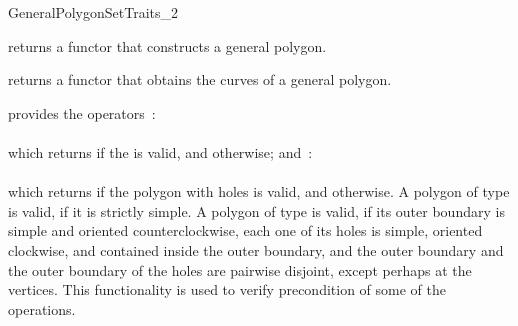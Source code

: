 \begin{ccRefConcept}{GeneralPolygonSetTraits_2}

{returns a functor that constructs a general polygon.}

{returns a functor that obtains the curves of a general polygon.}

{provides the operators~: \\
  \\
 which returns  if the  is valid, and 
 otherwise; and~: \\
  \\
 which returns  if the polygon with holes  
 is valid, and  otherwise.
 A polygon of type  is valid, if it is strictly simple.
 A polygon of type  is valid, if its outer 
 boundary is simple and oriented counterclockwise, each one of its holes 
 is simple, oriented clockwise, and contained inside the outer boundary, 
 and the outer boundary and the outer boundary of the holes are pairwise 
 disjoint, except perhaps at the vertices. This functionality is used to
 verify precondition of some of the operations.}

\ccHasModels
\\
\\

\ccSeeAlso
\ccSeeAlso
  \\

\end{ccRefConcept}

\ccRefPageEnd

